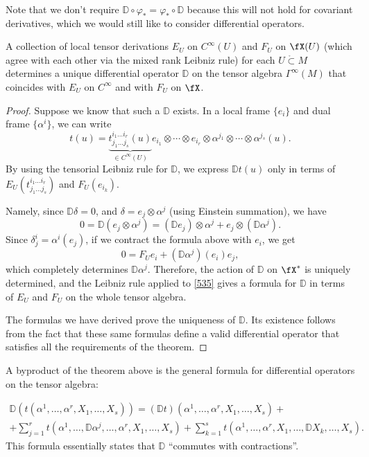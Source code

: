 Note that we don't require $\mathbb{D}\circ\varphi_\ast=\varphi_\ast\circ \mathbb{D}$ because this will not hold for covariant derivatives, which we would still like to consider differential operators.

\begin{thm}\label{Willmore}
    A collection of local tensor derivations $E_U$ on $C^\infty(U)$ and $F_U$ on $\fX(U)$ (which agree with each other via the mixed rank Leibniz rule) for each $U\mathring{\subset}M$ determines a unique differential operator $\mathbb{D}$ on the tensor algebra $\Gamma^\infty(M)$ that coincides with $E_U$ on $C^\infty$ and with $F_U$ on $\fX$.
\end{thm}
\begin{proof}
    Suppose we know that such a $\mathbb{D}$ exists. In a local frame $\{e_i\}$ and dual frame $\{\alpha^i\}$, we can write
    \[t(u)=\underbrace{t_{j_1\ldots j_s}^{i_1\ldots i_r}(u)}_{\in C^\infty(U)} e_{i_1}\otimes \cdots \otimes e_{i_r}\otimes \alpha^{j_1}\otimes \cdots\otimes \alpha^{j_s}(u).\label{535}\]
    By using the tensorial Leibniz rule for $\mathbb{D}$, we express $\mathbb{D}t(u)$ only in terms of $E_U(t_{j_1\ldots j_s}^{i_1\ldots i_r})$ and $F_U(e_{i_k})$.
    
    Namely, since $\mathbb{D}\delta=0$, and $\delta=e_j\otimes \alpha^j$ (using Einstein summation), we have 
    \[0=\mathbb{D}(e_j\otimes \alpha^j)=(\mathbb{D}e_j)\otimes \alpha^j+e_j\otimes (\mathbb{D}\alpha^j).\]
    Since $\delta^i_j=\alpha^i(e_j)$, if we contract the formula above with $e_i$, we get
    \[0=F_U e_i+(\mathbb{D}\alpha^j)(e_i) e_j,\]
    which completely determines $\mathbb{D}\alpha^j$. Therefore, the action of $\mathbb{D}$ on $\fX^\ast$ is uniquely determined, and the Leibniz rule applied to \ref{535} gives a formula for $\mathbb{D}$ in terms of $E_U$ and $F_U$ on the whole tensor algebra.
    
    The formulas we have derived prove the uniqueness of $\mathbb{D}$. Its existence follows from the fact that these same formulas define a valid differential operator that satisfies all the requirements of the theorem.
\end{proof}
\begin{cor}\label{cor willmore formula}
    A byproduct of the theorem above is the general formula for differential operators on the tensor algebra:

    \begin{multline}
        \mathbb{D}\left(t(\alpha^1,\ldots,\alpha^r,X_1,\ldots,X_s)\right)=(\mathbb{D}t)(\alpha^1,\ldots,\alpha^r,X_1,\ldots,X_s)+\\+\sum_{j=1}^r t\left(\alpha^1,\ldots,\mathbb{D}\alpha^j,\ldots,\alpha^r,X_1,\ldots,X_s\right)+\sum_{k=1}^s t\left(\alpha^1,\ldots,\alpha^r,X_1,\ldots,\mathbb{D}X_k,\ldots,X_s\right).
    \end{multline}
    This formula essentially states that $\mathbb{D}$ ``commutes with contractions''.
\end{cor}

